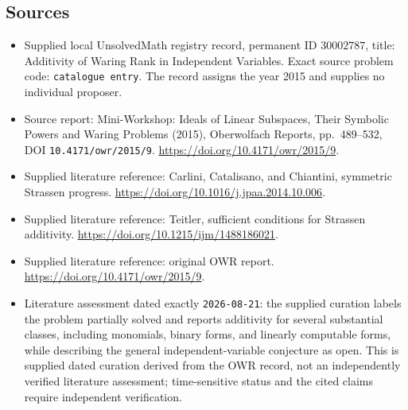 \documentclass[11pt]{article}
\begin{document}
\subsection{Sources}
\begin{itemize}
\item Supplied local UnsolvedMath registry record, permanent ID \(30002787\), title: Additivity of Waring Rank in Independent Variables. Exact source problem code: \texttt{catalogue entry}. The record assigns the year 2015 and supplies no individual proposer.
\item Source report: Mini-Workshop: Ideals of Linear Subspaces, Their Symbolic Powers and Waring Problems (2015), Oberwolfach Reports, pp.\ 489--532, DOI \texttt{10.4171/owr/2015/9}. \url{https://doi.org/10.4171/owr/2015/9}.
\item Supplied literature reference: Carlini, Catalisano, and Chiantini, symmetric Strassen progress. \url{https://doi.org/10.1016/j.jpaa.2014.10.006}.
\item Supplied literature reference: Teitler, sufficient conditions for Strassen additivity. \url{https://doi.org/10.1215/ijm/1488186021}.
\item Supplied literature reference: original OWR report. \url{https://doi.org/10.4171/owr/2015/9}.
\item Literature assessment dated exactly \texttt{2026-08-21}: the supplied curation labels the problem partially solved and reports additivity for several substantial classes, including monomials, binary forms, and linearly computable forms, while describing the general independent-variable conjecture as open. This is supplied dated curation derived from the OWR record, not an independently verified literature assessment; time-sensitive status and the cited claims require independent verification.
\end{itemize}
\end{document}

